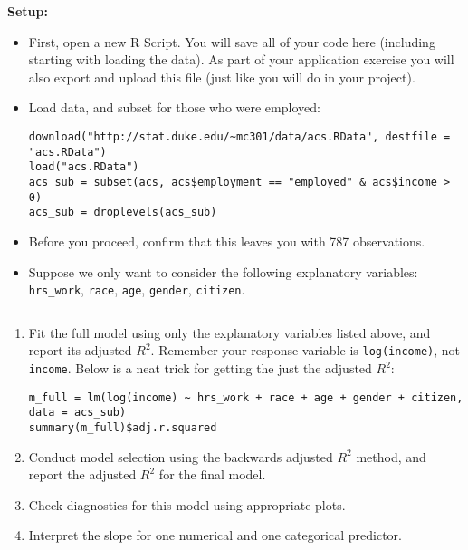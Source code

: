 \documentclass[11pt]{article}
\begin{document}
\pagebreak

\textbf{Setup:}

\begin{itemize}

\item First, open a new R Script. You will save all of your code here (including starting with loading the data). As part of your application exercise you will also export and upload this file (just like you will do in your project).

\item Load data, and subset for those who were employed:

\begin{verbatim}
download("http://stat.duke.edu/~mc301/data/acs.RData", destfile = "acs.RData")
load("acs.RData")
acs_sub = subset(acs, acs$employment == "employed" & acs$income > 0)
acs_sub = droplevels(acs_sub)
\end{verbatim}

\item Before you proceed, confirm that this leaves you with 787 observations.

\item Suppose we only want to consider the following explanatory variables: \texttt{hrs\_work}, \texttt{race}, \texttt{age}, \texttt{gender}, \texttt{citizen}.

\end{itemize}

$\:$ \\

\begin{enumerate}

\item Fit the full model using only the explanatory variables listed above, and report its adjusted $R^2$. Remember your response variable is \texttt{log(income)}, not \texttt{income}. Below is a neat trick for getting the just the adjusted $R^2$:

\begin{verbatim}
m_full = lm(log(income) ~ hrs_work + race + age + gender + citizen, data = acs_sub)
summary(m_full)$adj.r.squared
\end{verbatim}

\item Conduct model selection using the backwards adjusted $R^2$ method, and report the adjusted $R^2$ for the final model.

\item Check diagnostics for this model using appropriate plots.

\item Interpret the slope for one numerical and one categorical predictor.

\end{enumerate}

%
\end{document}

